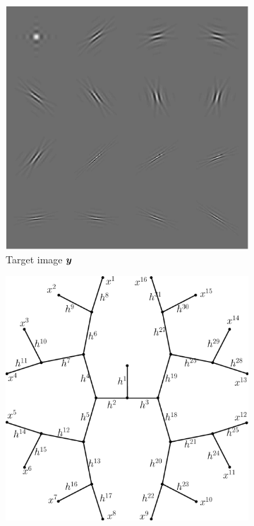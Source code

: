 \begin{figure}[!h] \centering
\begin{subfigure}[b]{0.325\textwidth}\centering
\includegraphics[width=\textwidth]{figures/tree-learn/target.pdf} 
	\caption{Target image $\bm{y}$}\label{fig_learntree_setup-target}
\end{subfigure}
\begin{subfigure}[b]{0.325\textwidth}\centering
\includegraphics[width=\textwidth]{figures/tree-learn/tree.pdf}

\end{subfigure}
\end{figure}
